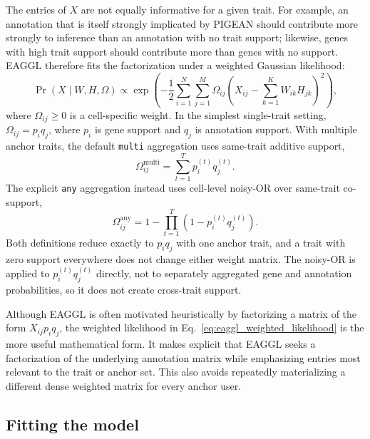 \documentclass[11pt]{article}
\begin{document}
The entries of $X$ are not equally informative for a given trait. For example, an annotation that is itself strongly implicated by PIGEAN should contribute more strongly to inference than an annotation with no trait support; likewise, genes with high trait support should contribute more than genes with no support. EAGGL therefore fits the factorization under a weighted Gaussian likelihood:
\begin{equation}
\Pr(X \mid W, H, \Omega)
\propto
\exp\left(
-\frac{1}{2}
\sum_{i=1}^N \sum_{j=1}^M
\Omega_{ij}
\left(
X_{ij} - \sum_{k=1}^K W_{ik} H_{jk}
\right)^2
\right),
\label{eq:eaggl_weighted_likelihood}
\end{equation}
where $\Omega_{ij} \ge 0$ is a cell-specific weight. In the simplest single-trait setting, $\Omega_{ij}=p_iq_j$, where $p_i$ is gene support and $q_j$ is annotation support. With multiple anchor traits, the default \texttt{multi} aggregation uses same-trait additive support,
\begin{equation}
\Omega_{ij}^{\mathrm{multi}}
=
\sum_{t=1}^T p_i^{(t)} q_j^{(t)}.
\label{eq:eaggl_weight_matrix}
\end{equation}
The explicit \texttt{any} aggregation instead uses cell-level noisy-OR over same-trait co-support,
\begin{equation}
\Omega_{ij}^{\mathrm{any}}
=
1 - \prod_{t=1}^T \left(1 - p_i^{(t)}q_j^{(t)}\right).
\label{eq:eaggl_any_weight_matrix}
\end{equation}
Both definitions reduce exactly to $p_iq_j$ with one anchor trait, and a trait with zero support everywhere does not change either weight matrix. The noisy-OR is applied to $p_i^{(t)}q_j^{(t)}$ directly, not to separately aggregated gene and annotation probabilities, so it does not create cross-trait support.

Although EAGGL is often motivated heuristically by factorizing a matrix of the form $X_{ij} p_i q_j$, the weighted likelihood in Eq.~\eqref{eq:eaggl_weighted_likelihood} is the more useful mathematical form. It makes explicit that EAGGL seeks a factorization of the underlying annotation matrix while emphasizing entries most relevant to the trait or anchor set. This also avoids repeatedly materializing a different dense weighted matrix for every anchor user.

\subsection{Fitting the model}
\end{document}
